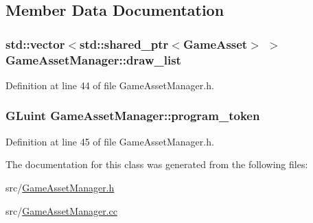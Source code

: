 \subsection{Member Data Documentation}
\hypertarget{class_game_asset_manager_a671cddd92f1de4186c582fe0c4297b7d}{}
\subsubsection[{draw\+\_\+list}]{\setlength{\rightskip}{0pt plus 5cm}std\+::vector$<$std\+::shared\+\_\+ptr$<${\bf Game\+Asset}$>$ $>$ Game\+Asset\+Manager\+::draw\+\_\+list\hspace{0.3cm}{\ttfamily [private]}}\label{class_game_asset_manager_a671cddd92f1de4186c582fe0c4297b7d}


Definition at line 44 of file Game\+Asset\+Manager.\+h.

\hypertarget{class_game_asset_manager_ad7bab17862e06ca692289f934b40548b}{}
\subsubsection[{program\+\_\+token}]{\setlength{\rightskip}{0pt plus 5cm}G\+Luint Game\+Asset\+Manager\+::program\+\_\+token\hspace{0.3cm}{\ttfamily [private]}}\label{class_game_asset_manager_ad7bab17862e06ca692289f934b40548b}


Definition at line 45 of file Game\+Asset\+Manager.\+h.



The documentation for this class was generated from the following files\+:\begin{DoxyCompactItemize}
\item 
src/\hyperlink{_game_asset_manager_8h}{Game\+Asset\+Manager.\+h}\item 
src/\hyperlink{_game_asset_manager_8cc}{Game\+Asset\+Manager.\+cc}\end{DoxyCompactItemize}

